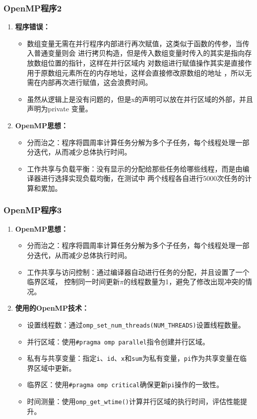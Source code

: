\documentclass{article}
\begin{document}
\subsubsection{OpenMP程序2}
\begin{enumerate}
    \item \textbf{程序错误：}
    \begin{itemize}
        \item 数组变量无需在并行程序内部进行再次赋值，这类似于函数的传参，当传入普通变量则会
        进行拷贝构造，但是传入数组变量时传入的其实是指向存放数组位置的指针，这样在并行区域内
        对数组进行赋值操作其实是直接作用于原数组元素所在的内存地址，这样会直接修改原数组的地址
        ，所以无需在内部再次进行赋值，这会浪费时间。
        \item 虽然从逻辑上是没有问题的，但是x的声明可以放在并行区域的外部，并且声明为private
        变量。
    \end{itemize}
    \item \textbf{OpenMP思想：}
    \begin{itemize}
        \item 分而治之：程序将圆周率计算任务分解为多个子任务，每个线程处理一部分迭代，从而减少总体执行时间。
        \item 工作共享与负载平衡：没有显示的分配给那些任务给哪些线程，而是由编译器进行选择实现负载均衡，在测试中
        两个线程各自进行5000次任务的计算和累加。
    \end{itemize}
\end{enumerate}
\subsubsection{OpenMP程序3}
\begin{enumerate}
    \item \textbf{OpenMP思想：}
    \begin{itemize}
        \item 分而治之：程序将圆周率计算任务分解为多个子任务，每个线程处理一部分迭代，从而减少总体执行时间。
        \item 工作共享与访问控制：通过编译器自动进行任务的分配，并且设置了一个临界区域，
        控制同一时间更新\texttt{$\pi$}的线程数量为1，避免了修改出现冲突的情况。
    \end{itemize}
    \item \textbf{使用的OpenMP技术：}
    \begin{itemize}
        \item 设置线程数：通过\texttt{omp\_set\_num\_threads(NUM\_THREADS)}设置线程数量。
        \item 并行区域：使用\texttt{\#pragma omp parallel}指令创建并行区域。
        \item 私有与共享变量：指定\texttt{i}、\texttt{id}、\texttt{x}和\texttt{sum}为私有变量，\texttt{pi}作为共享变量在临界区域中更新。
        \item 临界区：使用\texttt{\#pragma omp critical}确保更新\texttt{pi}操作的一致性。
        \item 时间测量：使用\texttt{omp\_get\_wtime()}计算并行区域的执行时间，评估性能提升。
    \end{itemize}
\end{enumerate}
\end{document}
